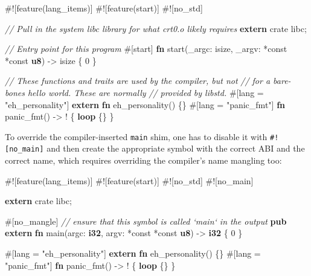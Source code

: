 \documentclass[a4paper,]{book}
\newenvironment{Shaded}{\begin{snugshade}}{\end{snugshade}}
\newcommand{\KeywordTok}[1]{\textcolor[rgb]{0.13,0.29,0.53}{\textbf{{#1}}}}
\newcommand{\DecValTok}[1]{\textcolor[rgb]{0.00,0.00,0.81}{{#1}}}
\newcommand{\StringTok}[1]{\textcolor[rgb]{0.31,0.60,0.02}{{#1}}}
\newcommand{\CommentTok}[1]{\textcolor[rgb]{0.56,0.35,0.01}{\textit{{#1}}}}
\newcommand{\OtherTok}[1]{\textcolor[rgb]{0.56,0.35,0.01}{{#1}}}
\newcommand{\NormalTok}[1]{{#1}}
\begin{document}
\begin{Shaded}
\begin{Highlighting}[]
\NormalTok{#![feature(lang_items)]}
\NormalTok{#![feature(start)]}
\NormalTok{#![no_std]}

\CommentTok{// Pull in the system libc library for what crt0.o likely requires}
\KeywordTok{extern} \NormalTok{crate libc;}

\CommentTok{// Entry point for this program}
\OtherTok{#[}\NormalTok{start}\OtherTok{]}
\KeywordTok{fn} \NormalTok{start(_argc: isize, _argv: *const *const }\KeywordTok{u8}\NormalTok{) -> isize \{}
    \DecValTok{0}
\NormalTok{\}}

\CommentTok{// These functions and traits are used by the compiler, but not}
\CommentTok{// for a bare-bones hello world. These are normally}
\CommentTok{// provided by libstd.}
\OtherTok{#[}\NormalTok{lang }\OtherTok{=} \StringTok{"eh_personality"}\OtherTok{]} \KeywordTok{extern} \KeywordTok{fn} \NormalTok{eh_personality() \{\}}
\OtherTok{#[}\NormalTok{lang }\OtherTok{=} \StringTok{"panic_fmt"}\OtherTok{]} \KeywordTok{fn} \NormalTok{panic_fmt() -> ! \{ }\KeywordTok{loop} \NormalTok{\{\} \}}
\end{Highlighting}
\end{Shaded}

To override the compiler-inserted \texttt{main} shim, one has to disable
it with \texttt{\#!{[}no\_main{]}} and then create the appropriate
symbol with the correct ABI and the correct name, which requires
overriding the compiler's name mangling too:

\begin{Shaded}
\begin{Highlighting}[]
\NormalTok{#![feature(lang_items)]}
\NormalTok{#![feature(start)]}
\NormalTok{#![no_std]}
\NormalTok{#![no_main]}

\KeywordTok{extern} \NormalTok{crate libc;}

\OtherTok{#[}\NormalTok{no_mangle}\OtherTok{]} \CommentTok{// ensure that this symbol is called `main` in the output}
\KeywordTok{pub} \KeywordTok{extern} \KeywordTok{fn} \NormalTok{main(argc: }\KeywordTok{i32}\NormalTok{, argv: *const *const }\KeywordTok{u8}\NormalTok{) -> }\KeywordTok{i32} \NormalTok{\{}
    \DecValTok{0}
\NormalTok{\}}

\OtherTok{#[}\NormalTok{lang }\OtherTok{=} \StringTok{"eh_personality"}\OtherTok{]} \KeywordTok{extern} \KeywordTok{fn} \NormalTok{eh_personality() \{\}}
\OtherTok{#[}\NormalTok{lang }\OtherTok{=} \StringTok{"panic_fmt"}\OtherTok{]} \KeywordTok{fn} \NormalTok{panic_fmt() -> ! \{ }\KeywordTok{loop} \NormalTok{\{\} \}}
\end{Highlighting}
\end{Shaded}
\end{document}
